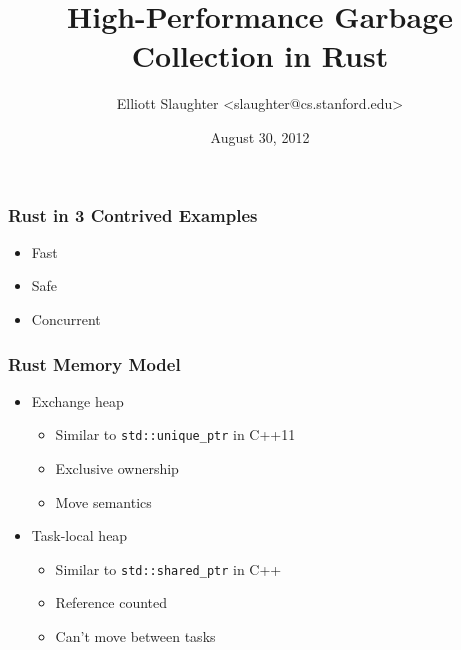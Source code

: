 \documentclass[ignorenonframetext,12pt]{beamer}
\title{High-Performance Garbage Collection in Rust}
\author{Elliott Slaughter \textless{}slaughter@cs.stanford.edu\textgreater{}}
\date{August 30, 2012}
\begin{document}
\frame{\titlepage}

\begin{frame}
\Large{}
\end{frame}

\begin{frame}[fragile]\frametitle{Rust in 3 Contrived Examples}
\begin{itemize}
  \item<alert@2> Fast
  \item<alert@3> Safe
  \item<alert@4> Concurrent
\end{itemize}

\begin{overlayarea}{\textwidth}{\textheight}
\only<2>{}
\only<3>{}
\end{overlayarea}
\end{frame}

\begin{frame}\frametitle{Rust Memory Model}
\begin{itemize}
  \item Exchange heap
  \begin{itemize}
    \item Similar to \texttt{std::unique\_ptr} in C++11
    \item Exclusive ownership
    \item Move semantics
  \end{itemize}
  \item Task-local heap
  \begin{itemize}
    \item Similar to \texttt{std::shared\_ptr} in C++
    \item Reference counted
    \item Can't move between tasks
  \end{itemize}
\end{itemize}
\end{frame}
\end{document}
